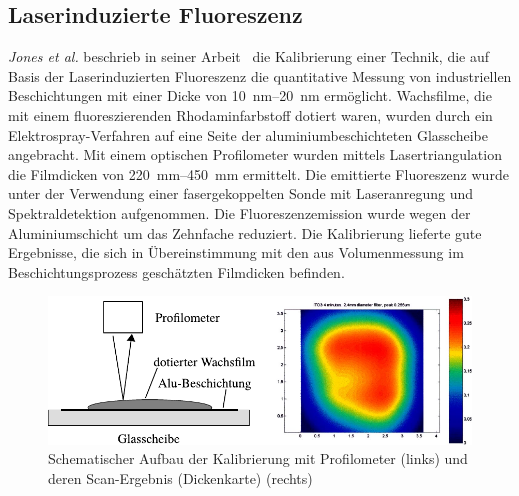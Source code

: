 \subsection{Laserinduzierte Fluoreszenz}
\label{sub:laserinduzierte_fluoreszenz}

\textit{Jones et al.} beschrieb in seiner Arbeit~\cite{jones_2001} die Kalibrierung einer Technik, die auf Basis der Laserinduzierten Fluoreszenz die quantitative Messung von industriellen Beschichtungen mit einer Dicke von \SIrange{10}{20}{\nano\meter} ermöglicht.
Wachsfilme, die mit einem fluoreszierenden Rhodaminfarbstoff dotiert waren, wurden durch ein Elektrospray-Verfahren auf eine Seite der aluminiumbeschichteten Glasscheibe angebracht.
Mit einem optischen Profilometer wurden mittels Lasertriangulation die Filmdicken von \SIrange{220}{450}{\milli\meter} ermittelt.
Die emittierte Fluoreszenz wurde unter der Verwendung einer fasergekoppelten Sonde mit Laseranregung und Spektraldetektion aufgenommen.
Die Fluoreszenzemission wurde wegen der Aluminiumschicht um das Zehnfache reduziert.
Die Kalibrierung lieferte gute Ergebnisse, die sich in Übereinstimmung mit den aus Volumenmessung im Beschichtungsprozess geschätzten Filmdicken befinden.

\begin{figure}[htb]
    \centering
    \includegraphics[]{./images/schematic_profilometer_and_scan_result_jones.pdf}
    \caption{Schematischer Aufbau der Kalibrierung mit Profilometer (links) und deren Scan-Ergebnis (Dickenkarte) (rechts)~\cite{jones_2001}}
    \label{fig:aufbau_laserinduzierte_kalibrierung_jones}
\end{figure}
